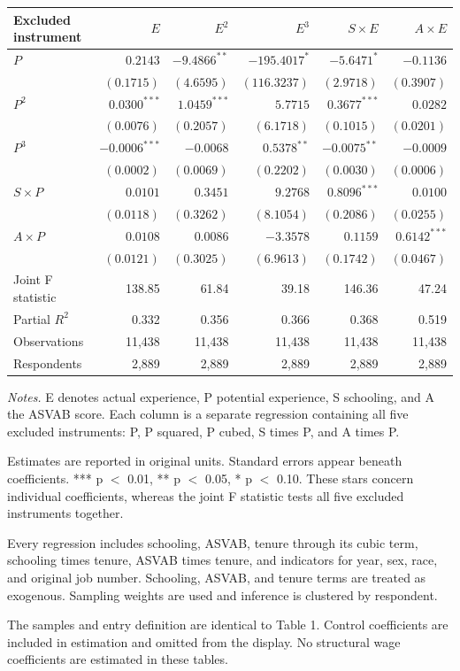 \noindent\begin{tabular*}{\textwidth}{@{\extracolsep{\fill}}lrrrrr@{}}
\toprule
Excluded instrument & $E$ & $E^2$ & $E^3$ & $S\times E$ & $A\times E$ \\
\midrule
$P$ & $0.2143$ & $-9.4866^{**}$ & $-195.4017^{*}$ & $-5.6471^{*}$ & $-0.1136$ \\
 & $(0.1715)$ & $(4.6595)$ & $(116.3237)$ & $(2.9718)$ & $(0.3907)$ \\[2pt]
$P^2$ & $0.0300^{***}$ & $1.0459^{***}$ & $5.7715$ & $0.3677^{***}$ & $0.0282$ \\
 & $(0.0076)$ & $(0.2057)$ & $(6.1718)$ & $(0.1015)$ & $(0.0201)$ \\[2pt]
$P^3$ & $-0.0006^{***}$ & $-0.0068$ & $0.5378^{**}$ & $-0.0075^{**}$ & $-0.0009$ \\
 & $(0.0002)$ & $(0.0069)$ & $(0.2202)$ & $(0.0030)$ & $(0.0006)$ \\[2pt]
$S\times P$ & $0.0101$ & $0.3451$ & $9.2768$ & $0.8096^{***}$ & $0.0100$ \\
 & $(0.0118)$ & $(0.3262)$ & $(8.1054)$ & $(0.2086)$ & $(0.0255)$ \\[2pt]
$A\times P$ & $0.0108$ & $0.0086$ & $-3.3578$ & $0.1159$ & $0.6142^{***}$ \\
 & $(0.0121)$ & $(0.3025)$ & $(6.9613)$ & $(0.1742)$ & $(0.0467)$ \\[2pt]
\midrule
Joint F statistic & 138.85 & 61.84 & 39.18 & 146.36 & 47.24 \\
Partial $R^2$ & 0.332 & 0.356 & 0.366 & 0.368 & 0.519 \\
Observations & 11,438 & 11,438 & 11,438 & 11,438 & 11,438 \\
Respondents & 2,889 & 2,889 & 2,889 & 2,889 & 2,889 \\
\bottomrule
\end{tabular*}\par\smallskip
\medskip
{\footnotesize
\noindent\textit{Notes.} E denotes actual experience, P potential experience, S schooling, and A the ASVAB score. Each column is a separate regression containing all five excluded instruments: P, P squared, P cubed, S times P, and A times P.\par
\smallskip\noindent Estimates are reported in original units. Standard errors appear beneath coefficients. *** p $<$ 0.01, ** p $<$ 0.05, * p $<$ 0.10. These stars concern individual coefficients, whereas the joint F statistic tests all five excluded instruments together.\par
\smallskip\noindent Every regression includes schooling, ASVAB, tenure through its cubic term, schooling times tenure, ASVAB times tenure, and indicators for year, sex, race, and original job number. Schooling, ASVAB, and tenure terms are treated as exogenous. Sampling weights are used and inference is clustered by respondent.\par
\smallskip\noindent The samples and entry definition are identical to Table 1. Control coefficients are included in estimation and omitted from the display. No structural wage coefficients are estimated in these tables.\par
}
